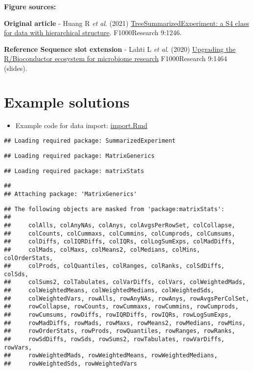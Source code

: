\documentclass[
  oneside]{book}
\providecommand{\tightlist}{%
  \setlength{\itemsep}{0pt}\setlength{\parskip}{0pt}}
\begin{document}
\textbf{Figure sources:}

\textbf{Original article}
- Huang R \emph{et al}. (2021) \href{https://doi.org/10.12688/\%20f1000research.26669.2}{TreeSummarizedExperiment: a S4 class
for data with hierarchical structure}. F1000Research 9:1246.

\textbf{Reference Sequence slot extension}
- Lahti L \emph{et al}. (2020) \href{https://doi.org/10.7490/\%20f1000research.1118447.1}{Upgrading the R/Bioconductor ecosystem for microbiome
research} F1000Research 9:1464 (slides).

\hypertarget{example-solutions}{%
\section{Example solutions}\label{example-solutions}}

\begin{itemize}
\tightlist
\item
  Example code for data import: \url{import.Rmd}
\end{itemize}

\begin{verbatim}
## Loading required package: SummarizedExperiment
\end{verbatim}

\begin{verbatim}
## Loading required package: MatrixGenerics
\end{verbatim}

\begin{verbatim}
## Loading required package: matrixStats
\end{verbatim}

\begin{verbatim}
## 
## Attaching package: 'MatrixGenerics'
\end{verbatim}

\begin{verbatim}
## The following objects are masked from 'package:matrixStats':
## 
##     colAlls, colAnyNAs, colAnys, colAvgsPerRowSet, colCollapse,
##     colCounts, colCummaxs, colCummins, colCumprods, colCumsums,
##     colDiffs, colIQRDiffs, colIQRs, colLogSumExps, colMadDiffs,
##     colMads, colMaxs, colMeans2, colMedians, colMins, colOrderStats,
##     colProds, colQuantiles, colRanges, colRanks, colSdDiffs, colSds,
##     colSums2, colTabulates, colVarDiffs, colVars, colWeightedMads,
##     colWeightedMeans, colWeightedMedians, colWeightedSds,
##     colWeightedVars, rowAlls, rowAnyNAs, rowAnys, rowAvgsPerColSet,
##     rowCollapse, rowCounts, rowCummaxs, rowCummins, rowCumprods,
##     rowCumsums, rowDiffs, rowIQRDiffs, rowIQRs, rowLogSumExps,
##     rowMadDiffs, rowMads, rowMaxs, rowMeans2, rowMedians, rowMins,
##     rowOrderStats, rowProds, rowQuantiles, rowRanges, rowRanks,
##     rowSdDiffs, rowSds, rowSums2, rowTabulates, rowVarDiffs, rowVars,
##     rowWeightedMads, rowWeightedMeans, rowWeightedMedians,
##     rowWeightedSds, rowWeightedVars
\end{verbatim}
\end{document}
